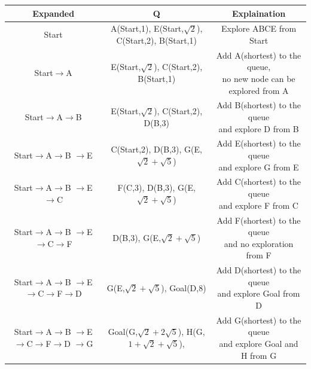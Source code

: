 \documentclass{article}
\begin{document}
        \begin{table}[H]
            \centering
            \begin{tabular}{c|c|c}
                 Expanded & Q & Explaination\\
                 \hline
                 Start & \makecell*[c]{A(Start,1), E(Start,$\sqrt{2}$),\\ C(Start,2), B(Start,1)} & Explore ABCE from Start \\
                 \hline
                 \textcolor[rgb]{1,0,0}{Start}$\rightarrow$A & E(Start,$\sqrt{2}$), C(Start,2), B(Start,1) & \makecell*[c]{Add A(shortest) to the queue,\\ no new node can be explored from A}\\
                 \hline
                 Start$\rightarrow$A$\rightarrow$B & \textcolor[rgb]{1,0,0}{E(Start,$\sqrt{2}$)}, C(Start,2), D(B,3) & \makecell*[c]{Add B(shortest) to the queue\\ and explore D from B} \\
                \hline
                \makecell*[c]{Start$\rightarrow$A$\rightarrow$B\\$\rightarrow$E} & C(Start,2), D(B,3), G(E,$\sqrt{2}+\sqrt{5}$) & \makecell*[c]{Add E(shortest) to the queue\\ and explore G from E}\\
                \hline
                \makecell*[c]{Start$\rightarrow$A$\rightarrow$B\\$\rightarrow$E$\rightarrow$C} & F(C,3), D(B,3), G(E,$\sqrt{2}+\sqrt{5}$) & \makecell*[c]{Add C(shortest) to the queue\\ and explore F from C}\\
                \hline
                \makecell*[c]{Start$\rightarrow$A$\rightarrow$B\\$\rightarrow$\textcolor[rgb]{1,0,0}{E}$\rightarrow$C$\rightarrow$F} & D(B,3), G(E,$\sqrt{2}+\sqrt{5}$) & \makecell*[c]{Add F(shortest) to the queue\\ and no exploration from F}\\
                \hline
                \makecell*[c]{Start$\rightarrow$A$\rightarrow$B\\$\rightarrow$E$\rightarrow$C$\rightarrow$F$\rightarrow$D} & \textcolor[rgb]{1,0,0}{G(E,$\sqrt{2}+\sqrt{5}$)}, Goal(D,8) & \makecell*[c]{Add D(shortest) to the queue\\ and explore Goal from D}\\
                \hline
                \makecell*[c]{Start$\rightarrow$A$\rightarrow$B\\$\rightarrow$E$\rightarrow$C$\rightarrow$F$\rightarrow$D\\$\rightarrow$\textcolor[rgb]{1,0,0}{G}} & Goal(G,$\sqrt{2}+2\sqrt{5}$), H(G,$1+\sqrt{2}+\sqrt{5}$), & \makecell*[c]{Add G(shortest) to the queue\\ and explore Goal and H from G}\\

\end{tabular}
\end{table}
\end{document}
